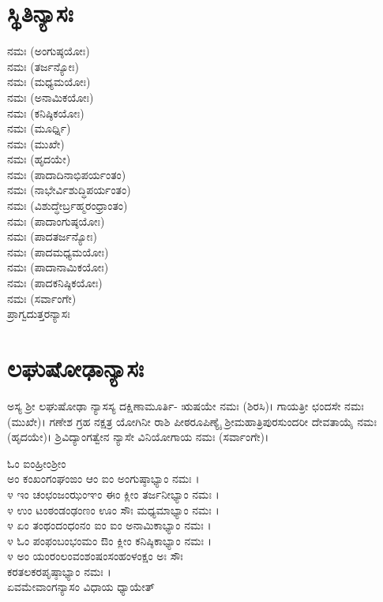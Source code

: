 \section{ಸ್ಥಿತಿನ್ಯಾಸಃ}
 ನಮಃ (ಅಂಗುಷ್ಠಯೋಃ)\\
 ನಮಃ (ತರ್ಜನ್ಯೋಃ)\\
 ನಮಃ (ಮಧ್ಯಮಯೋಃ)\\
 ನಮಃ (ಅನಾಮಿಕಯೋಃ)\\
 ನಮಃ (ಕನಿಷ್ಠಿಕಯೋಃ)\\
 ನಮಃ (ಮೂರ್ಧ್ನಿ)\\
 ನಮಃ (ಮುಖೇ)\\
 ನಮಃ (ಹೃದಯೇ)\\
 ನಮಃ (ಪಾದಾದಿನಾಭಿಪರ್ಯಂತಂ)\\
 ನಮಃ (ನಾಭೇರ್ವಿಶುದ್ಧಿಪರ್ಯಂತಂ)\\
 ನಮಃ (ವಿಶುದ್ಧೇರ್ಬ್ರಹ್ಮರಂಧ್ರಾಂತಂ)\\
 ನಮಃ (ಪಾದಾಂಗುಷ್ಠಯೋಃ)\\
 ನಮಃ (ಪಾದತರ್ಜನ್ಯೋಃ)\\
 ನಮಃ (ಪಾದಮಧ್ಯಮಯೋಃ)\\
 ನಮಃ (ಪಾದಾನಾಮಿಕಯೋಃ)\\
 ನಮಃ (ಪಾದಕನಿಷ್ಠಿಕಯೋಃ)\\
 ನಮಃ (ಸರ್ವಾಂಗೇ)\\
ಪ್ರಾಗ್ವದುತ್ತರನ್ಯಾಸಃ
\section{ಲಘುಷೋಢಾನ್ಯಾಸಃ}
ಅಸ್ಯ ಶ್ರೀ ಲಘುಷೋಢಾ ನ್ಯಾಸಸ್ಯ ದಕ್ಷಿಣಾಮೂರ್ತಿ- ಋಷಯೇ ನಮಃ (ಶಿರಸಿ)। ಗಾಯತ್ರೀ ಛಂದಸೇ ನಮಃ (ಮುಖೇ)। ಗಣೇಶ ಗ್ರಹ ನಕ್ಷತ್ರ ಯೋಗಿನೀ ರಾಶಿ ಪೀಠರೂಪಿಣ್ಯೈ ಶ್ರೀಮಹಾತ್ರಿಪುರಸುಂದರೀ ದೇವತಾಯೈ ನಮಃ (ಹೃದಯೇ)।  ಶ್ರಿವಿದ್ಯಾಂಗತ್ವೇನ ನ್ಯಾಸೇ ವಿನಿಯೋಗಾಯ ನಮಃ (ಸರ್ವಾಂಗೇ)।

ಓಂ ಐಂಹ್ರೀಂಶ್ರೀಂ \\ಅಂ ಕಂಖಂಗಂಘಂಙಂ ಆಂ ಐಂ ಅಂಗುಷ್ಠಾಭ್ಯಾಂ ನಮಃ ।\\
೪ ಇಂ ಚಂಛಂಜಂಝಂಞಂ ಈಂ ಕ್ಲೀಂ ತರ್ಜನೀಭ್ಯಾಂ ನಮಃ ।\\
೪ ಉಂ ಟಂಠಂಡಂಢಂಣಂ ಊಂ ಸೌಃ ಮಧ್ಯಮಾಭ್ಯಾಂ ನಮಃ ।\\
೪ ಏಂ ತಂಥಂದಂಧಂನಂ ಐಂ ಐಂ ಅನಾಮಿಕಾಭ್ಯಾಂ ನಮಃ ।\\
೪ ಓಂ ಪಂಫಂಬಂಭಂಮಂ ಔಂ ಕ್ಲೀಂ ಕನಿಷ್ಠಿಕಾಭ್ಯಾಂ ನಮಃ ।\\
೪ ಅಂ ಯಂರಂಲಂವಂಶಂಷಂಸಂಹಂಳಂಕ್ಷಂ ಅಃ ಸೌಃ\\ ಕರತಲಕರಪೃಷ್ಠಾಭ್ಯಾಂ ನಮಃ ।\\
ಏವಮೇವಾಂಗನ್ಯಾಸಂ ವಿಧಾಯ ಧ್ಯಾಯೇತ್ 

